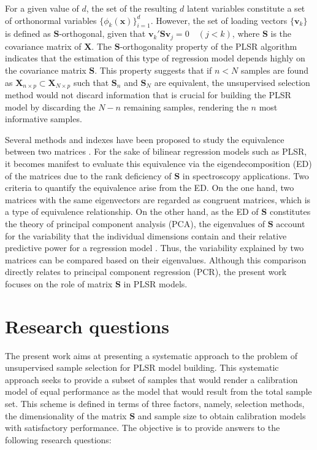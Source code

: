 \documentclass[preprint,12pt]{elsarticle}
\begin{document}
For a given value of $d$, the set of the resulting $d$ latent variables constitute a set of orthonormal variables $\{\phi_{k}(\mathbf{x})\}_{i=1}^d$. However, the set of loading vectors $\{\mathbf{v}_k\}$ is defined as $\mathbf{S}$-orthogonal, given that $\mathbf{v}_k'\mathbf{S}\mathbf{v}_j = 0 \quad (j<k)$, where $\mathbf{S}$ is the covariance matrix of $\mathbf{X}$. The $\mathbf{S}$-orthogonality property of the PLSR algorithm indicates that the estimation of this type of regression model depends highly on the covariance matrix $\mathbf{S}$. This property suggests that if $n<N$ samples are found as $\mathbf{X}_{n \times p} \subset \mathbf{X}_{N \times p}$ such that $\mathbf{S}_n$ and $\mathbf{S}_N$ are equivalent, the unsupervised selection method would not discard information that is crucial for building the PLSR model by discarding the $N-n$ remaining samples, rendering the $n$ most informative samples.

Several methods and indexes have been proposed to study the equivalence between two matrices \cite{Tomic2013}. For the sake of bilinear regression models such as PLSR, it becomes manifest to evaluate this equivalence via the eigendecomposition (ED) of the matrices due to the rank deficiency of $\mathbf{S}$ in spectroscopy applications. Two criteria to quantify the equivalence arise from the ED. On the one hand, two matrices with the same eigenvectors are regarded as congruent matrices, which is a type of equivalence relationship\cite{Horn1985}. On the other hand, as the ED of $\mathbf{S}$ constitutes the theory of principal component analysis (PCA), the eigenvalues of $\mathbf{S}$ account for the variability that the individual dimensions contain and their relative predictive power for a regression model \cite{Artemiou2013}. Thus, the variability explained by two matrices can be compared based on their eigenvalues. Although this comparison directly relates to principal component regression (PCR), the present work focuses on the role of matrix $\mathbf{S}$ in PLSR models.



\section{Research questions}

The present work aims at presenting a systematic approach to the problem of unsupervised sample selection for PLSR model building. This systematic approach seeks to provide a subset of samples that would render a calibration model of equal performance as the model that would result from the total sample set. This scheme is defined in terms of three factors, namely, selection methods, the dimensionality of the matrix $\mathbf{S}$ and sample size to obtain calibration models with satisfactory performance. The objective is to provide answers to the following research questions:
\end{document}
